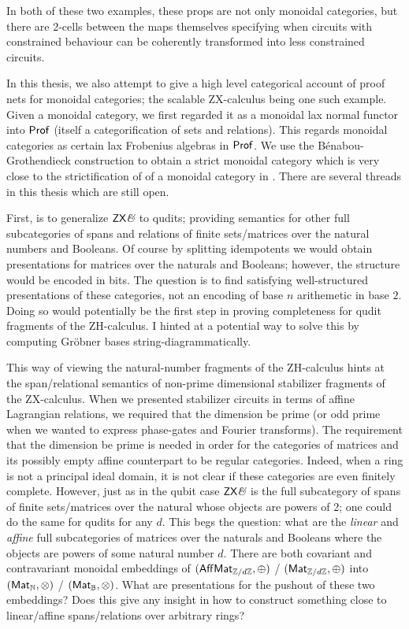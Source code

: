 \documentclass[12pt]{ociamthesis}  %
\begin{document}
In both of these two examples, these props are not only monoidal categories, but there are 2-cells between the maps themselves specifying when circuits with constrained behaviour can be coherently transformed into less constrained circuits.

In this thesis, we also attempt to give a high level categorical account of proof nets for monoidal categories; the scalable ZX-calculus being one such example.  Given a monoidal category, we first  regarded it as a monoidal lax normal functor into ${\sf Prof}$ (itself a categorification of sets and relations). This regards monoidal categories as certain lax Frobenius algebras in ${\sf Prof}$. We use the B\'enabou-Grothendieck construction to obtain a strict monoidal category which is very close to the strictification of of a monoidal category in \cite{wilson}.  
There are several threads in this thesis which are still open.

First, is to generalize $\mathsf{ZX}\textit{\&}$ to qudits; providing semantics for other full subcategories of spans and relations of finite sets/matrices over the natural numbers and Booleans.  Of course by splitting idempotents we would obtain presentations for matrices over the naturals and Booleans; however, the structure would be encoded in bits.  The question is to find satisfying well-structured presentations of these categories, not an encoding of base $n$ arithemetic in base $2$.  Doing so would potentially be the first step in proving completeness for qudit fragments of the ZH-calculus.  I hinted at a potential way to solve this by computing Gr\"obner bases string-diagrammatically.  

This way of viewing the natural-number fragments of the ZH-calculus hints at the span/relational semantics of non-prime dimensional stabilizer fragments of the  ZX-calculus.  When we presented stabilizer circuits in terms of affine Lagrangian relations, we required that the dimension be prime (or odd prime when we wanted to express phase-gates and Fourier transforms).  The requirement that the dimension be prime is needed in order for the categories of matrices and its possibly empty affine counterpart to be regular categories.  Indeed,  when a ring is not a principal ideal domain, it is not clear if these categories are even finitely complete.  However, just as in the qubit case $\mathsf{ZX}\textit{\&}$ is the full subcategory of spans of finite sets/matrices over the natural whose objects are powers of 2; one could do the same for qudits for any $d$.  This begs the question: what are the {\em linear} and {\em affine} full subcategories of matrices over the naturals and Booleans where the objects are powers of some natural number $d$.  There are both covariant and contravariant monoidal embeddings of $(\mathsf{Aff}\mathsf{Mat}_{\mathbb{Z}/d\mathbb{Z}},\oplus)$ / $(\mathsf{Mat}_{\mathbb{Z}/d\mathbb{Z}},\oplus)$ into $(\mathsf{Mat}_{\mathbb{N}},\otimes)$ / $(\mathsf{Mat}_{\mathbb{B}},\otimes)$.  What are presentations for the pushout of these two embeddings?  Does this give any insight in how to construct something close to linear/affine spans/relations over arbitrary rings?
\end{document}
